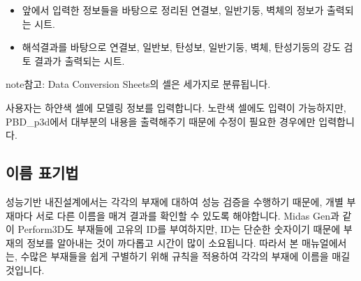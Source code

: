 \documentclass[a4paper,10pt,korean]{sphinxmanual}
\begin{document}
\begin{itemize}
\begin{description}
\end{description}

\item {} \begin{description}
\sphinxAtStartPar
앞에서 입력한 정보들을 바탕으로 정리된 연결보, 일반기둥, 벽체의 정보가 출력되는 시트.

\end{description}

\item {} \begin{description}
\sphinxAtStartPar
해석결과를 바탕으로 연결보, 일반보, 탄성보, 일반기둥, 벽체, 탄성기둥의 강도 검토 결과가 출력되는 시트.

\end{description}

\end{itemize}

\begin{sphinxadmonition}{note}{참고:}
\sphinxAtStartPar
Data Conversion Sheets의 셀은 세가지로 분류됩니다.


\sphinxAtStartPar
사용자는 하얀색 셀에 모델링 정보를 입력합니다.
노란색 셀에도 입력이 가능하지만, PBD\_p3d에서 대부분의 내용을 출력해주기 때문에 수정이 필요한 경우에만 입력합니다.
\end{sphinxadmonition}

\sphinxstepscope


\subsection{이름 표기법}
\label{\detokenize{2_naming_rules:id1}}\label{\detokenize{2_naming_rules::doc}}
\sphinxAtStartPar
성능기반 내진설계에서는 각각의 부재에 대하여 성능 검증을 수행하기 때문에, 개별 부재마다 서로 다른 이름을 매겨 결과를 확인할 수 있도록 해야합니다.
Midas Gen과 같이 Perform\sphinxhyphen{}3D도 부재들에 고유의 ID를 부여하지만, ID는 단순한 숫자이기 때문에 부재의 정보를 알아내는 것이 까다롭고 시간이 많이 소요됩니다.
따라서 본 매뉴얼에서는, 수많은 부재들을 쉽게 구별하기 위해 규칙을 적용하여 각각의 부재에 이름을 매길 것입니다.
\end{document}

